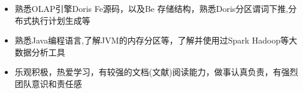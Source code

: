  \begin{itemize}[leftmargin=*]
    \item {熟悉OLAP引擎Doris Fe源码，以及Be 存储结构，熟悉Doris分区谓词下推,分布式执行计划生成等}
    \item {熟悉Java编程语言,了解JVM的内存分区等，了解并使用过Spark Hadoop等大数据分析工具}
    \item {乐观积极，热爱学习，有较强的文档(文献)阅读能力，做事认真负责，有强烈团队意识和责任感}
  \end{itemize}